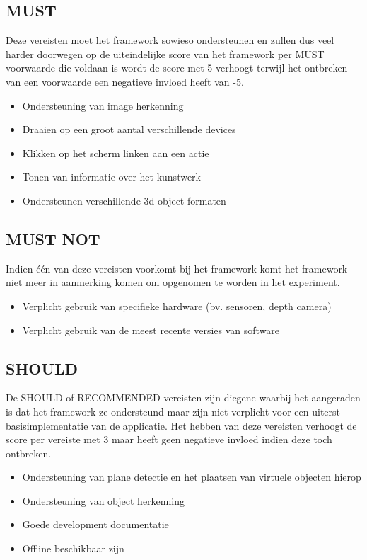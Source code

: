 \subsection{MUST}
Deze vereisten moet het framework sowieso ondersteunen en zullen dus veel harder doorwegen op de uiteindelijke score van het framework per MUST voorwaarde die voldaan is wordt de score met 5 verhoogt terwijl het ontbreken van een voorwaarde een negatieve invloed heeft van -5.
\begin{itemize}
    \item Ondersteuning van image herkenning
    \item Draaien op een groot aantal verschillende devices
    \item Klikken op het scherm linken aan een actie
    \item Tonen van informatie over het kunstwerk
    \item Ondersteunen verschillende 3d object formaten
\end{itemize} 

\subsection{MUST NOT}
Indien één van deze vereisten voorkomt bij het framework komt het framework niet meer in aanmerking komen om opgenomen te worden in het experiment.
\begin{itemize}
    \item Verplicht gebruik van specifieke hardware (bv. sensoren, depth camera)
    \item Verplicht gebruik van de meest recente versies van software
\end{itemize} 

\subsection{SHOULD}
De SHOULD of RECOMMENDED vereisten zijn diegene waarbij het aangeraden is dat het framework ze ondersteund maar zijn niet verplicht voor een uiterst basisimplementatie van de applicatie. Het hebben van deze vereisten verhoogt de score per vereiste met 3 maar heeft geen negatieve invloed  indien deze toch ontbreken.
\begin{itemize}
    \item Ondersteuning van plane detectie en het plaatsen van virtuele objecten hierop
    \item Ondersteuning van object herkenning
    \item Goede development documentatie
    \item Offline beschikbaar zijn
\end{itemize} 

